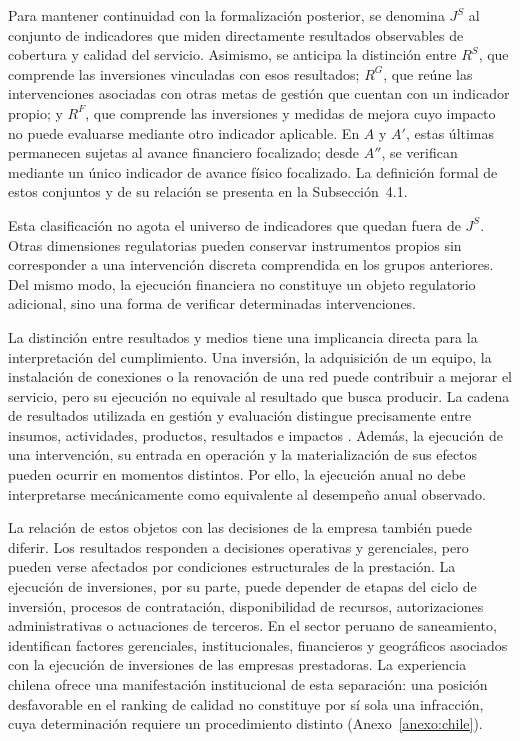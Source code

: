 Para mantener continuidad con la formalización posterior, se denomina \(J^{S}\) al conjunto de indicadores que miden directamente resultados observables de cobertura y calidad del servicio. Asimismo, se anticipa la distinción entre \(R^{S}\), que comprende las inversiones vinculadas con esos resultados; \(R^{G}\), que reúne las intervenciones asociadas con otras metas de gestión que cuentan con un indicador propio; y \(R^{F}\), que comprende las inversiones y medidas de mejora cuyo impacto no puede evaluarse mediante otro indicador aplicable. En \(A\) y \(A'\), estas últimas permanecen sujetas al avance financiero focalizado; desde \(A''\), se verifican mediante un único indicador de avance físico focalizado. La definición formal de estos conjuntos y de su relación se presenta en la Subsección~4.1.

Esta clasificación no agota el universo de indicadores que quedan fuera de \(J^{S}\). Otras dimensiones regulatorias pueden conservar instrumentos propios sin corresponder a una intervención discreta comprendida en los grupos anteriores. Del mismo modo, la ejecución financiera no constituye un objeto regulatorio adicional, sino una forma de verificar determinadas intervenciones.

La distinción entre resultados y medios tiene una implicancia directa para la interpretación del cumplimiento. Una inversión, la adquisición de un equipo, la instalación de conexiones o la renovación de una red puede contribuir a mejorar el servicio, pero su ejecución no equivale al resultado que busca producir. La cadena de resultados utilizada en gestión y evaluación distingue precisamente entre insumos, actividades, productos, resultados e impactos \citep{oecd2023glossary}. Además, la ejecución de una intervención, su entrada en operación y la materialización de sus efectos pueden ocurrir en momentos distintos. Por ello, la ejecución anual no debe interpretarse mecánicamente como equivalente al desempeño anual observado.

La relación de estos objetos con las decisiones de la empresa también puede diferir. Los resultados responden a decisiones operativas y gerenciales, pero pueden verse afectados por condiciones estructurales de la prestación. La ejecución de inversiones, por su parte, puede depender de etapas del ciclo de inversión, procesos de contratación, disponibilidad de recursos, autorizaciones administrativas o actuaciones de terceros. En el sector peruano de saneamiento, \citet{escobar2025determinantes} identifican factores gerenciales, institucionales, financieros y geográficos asociados con la ejecución de inversiones de las empresas prestadoras. La experiencia chilena ofrece una manifestación institucional de esta separación: una posición desfavorable en el ranking de calidad no constituye por sí sola una infracción, cuya determinación requiere un procedimiento distinto (Anexo~\ref{anexo:chile}).

